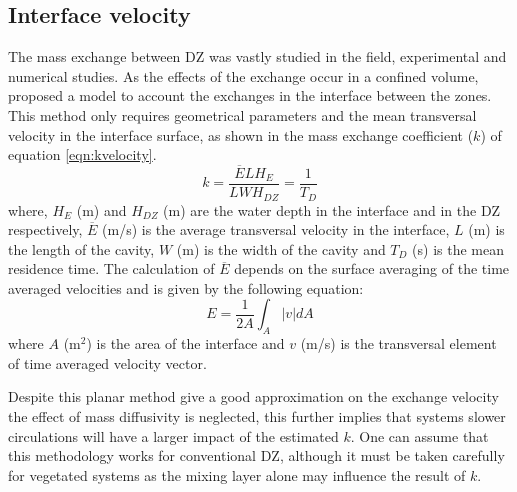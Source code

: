 \subsection{Interface velocity}
The mass exchange between DZ was vastly studied in the field, experimental and numerical studies. As the effects of the exchange occur in a confined volume, \textcite{weitbrecht2001} proposed a model to account the exchanges in the interface between the zones. This method only requires geometrical parameters and the mean transversal velocity in the interface surface, as shown in the mass exchange coefficient ($k$) of equation \ref{eqn:kvelocity}.
\begin{equation}
k=\frac{\overline{E}LH_E}{L WH_{DZ}}=\frac{1}{T_D}
\label{eqn:kvelocity}
\end{equation}
where, $H_E$ (m) and $H_{DZ}$ (m) are the water depth in the interface and in the DZ respectively, $\overline{E}$ (m/s) is the average transversal velocity in the interface, $L$ (m) is the length of the cavity, $W$ (m) is the width of the cavity and $T_D$ (s) is the mean residence time. The calculation of $\overline{E}$ depends on the surface averaging of the time averaged velocities and is given by the following equation:
\begin{equation}
E = \frac{1}{2A}\int_{A}^{}\left | v \right |dA
\label{eqn:exchangeVel}
 \end{equation}
 where $A$ (m$^2$) is the area of the interface and $v$ (m/s) is the transversal element of time averaged velocity vector.

Despite this planar method give a good approximation on the exchange velocity the effect of mass diffusivity is neglected, this further implies that systems slower circulations will have a larger impact of the estimated $k$. One can assume that this methodology works for conventional DZ, although it must be taken carefully for vegetated systems as the mixing layer alone may influence the result of $k$.

